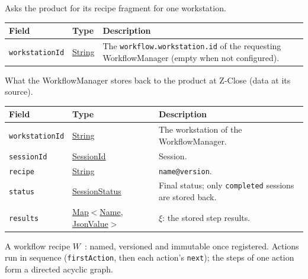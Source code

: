 \documentclass[a4paper]{arrowhead}
\newcommand{\mref}[1]{{\textcolor{ArrowheadPurple}{\hyperref[sec:model:#1]{#1}}}}
\newcommand{\pref}[1]{{\textcolor{ArrowheadGrey}{\hyperref[sec:model:primitives:#1]{#1}}}}
\begin{document}
Asks the product for its recipe fragment for one workstation.

{\small
\begin{longtable}{|p{3.9cm}|p{4.4cm}|p{7.5cm}|}

\hline
\rowcolor{gray!33} Field & Type & Description \\ \hline
\endhead
\texttt{workstationId} & \pref{String} & The \texttt{workflow.\allowbreak{}workstation.\allowbreak{}id} of the requesting WorkflowManager (empty when not configured). \\ \hline
\end{longtable}
}

What the WorkflowManager stores back to the product at Z-Close (data at its source).

{\small
\begin{longtable}{|p{3.9cm}|p{4.4cm}|p{7.5cm}|}

\hline
\rowcolor{gray!33} Field & Type & Description \\ \hline
\endhead
\texttt{workstationId} & \pref{String} & The workstation of the WorkflowManager. \\ \hline
\texttt{sessionId} & \pref{SessionId} & Session. \\ \hline
\texttt{recipe} & \pref{String} & \texttt{name@version}. \\ \hline
\texttt{status} & \mref{SessionStatus} & Final status; only \texttt{completed} sessions are stored back. \\ \hline
\texttt{results} & \pref{Map}$<$\pref{Name}, \pref{JsonValue}$>$ & $\xi$: the stored step results. \\ \hline
\end{longtable}
}

A workflow recipe $W$~\cite{varga2026}: named, versioned and immutable once registered. Actions run in sequence (\texttt{firstAction}, then each action's \texttt{next}); the steps of one action form a directed acyclic graph.
\end{document}
